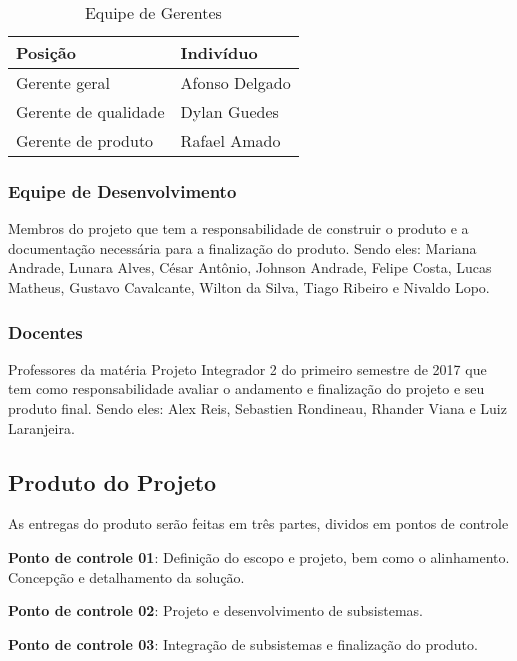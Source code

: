 \begin{table}[]
\centering
\caption{Equipe de Gerentes}
\label{equipe_gerentes}
\begin{tabular}{|l|l|}
\hline
Posição              & Indivíduo      \\ \hline
Gerente geral        & Afonso Delgado \\ \hline
Gerente de qualidade & Dylan Guedes   \\ \hline
Gerente de produto   & Rafael Amado   \\ \hline
\end{tabular}
\end{table}

\subsubsection{Equipe de Desenvolvimento}
Membros do projeto que tem a responsabilidade de construir o produto e a 
documentação necessária para a finalização do produto. Sendo eles: Mariana 
Andrade, Lunara Alves, César Antônio, Johnson Andrade, Felipe Costa, Lucas 
Matheus, Gustavo Cavalcante, Wilton da Silva, Tiago Ribeiro e Nivaldo Lopo.


\subsubsection{Docentes}
Professores da matéria Projeto Integrador 2 do primeiro semestre de 2017 que 
tem como responsabilidade avaliar o andamento e finalização do projeto e seu 
produto final. Sendo eles: Alex Reis, Sebastien Rondineau, Rhander Viana e 
Luiz Laranjeira.

\subsection{Produto do Projeto}
As entregas do produto serão feitas em três partes, dividos em pontos de controle

\textbf{Ponto de controle 01}: Definição do escopo e projeto, bem como o 
alinhamento. Concepção e detalhamento da solução.

\textbf{Ponto de controle 02}: Projeto e desenvolvimento de subsistemas.


\textbf{Ponto de controle 03}: Integração de subsistemas e finalização do 
produto.

